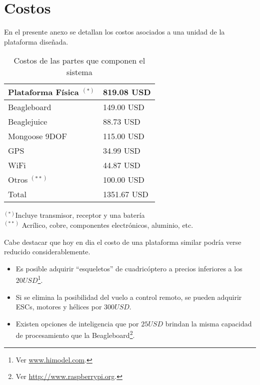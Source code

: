 \documentclass[main]{subfiles}
\begin{document}
\chapter{Costos}
\label{chap:anexo_costos}
En el presente anexo se detallan los costos asociados a una unidad de la plataforma dise\~nada. 

\begin{table}[H]
\begin{center}
\begin{tabular}{|p{5cm}|p{3cm}|}
\hline
Plataforma F\'isica $^{(*)}$  & 819.08 USD  \\
\hline
Beagleboard & 149.00 USD \\
\hline
Beaglejuice & 88.73 USD\\
\hline 
Mongoose 9DOF & 115.00 USD\\
\hline
GPS & 34.99 USD\\
\hline
WiFi & 44.87 USD\\
\hline
Otros $^{(**)}$ & 100.00 USD\\
\hline
Total & 1351.67 USD \\
\hline
\end{tabular}
\label{tab:acc-anexo}
\end{center}
\begin{center}
$^{(*)}$Incluye transmisor, receptor y una bater\'ia\\
$^{(**)}$ Acr\'ilico, cobre, componentes electr\'onicos, aluminio, etc.
\end{center}
\caption{Costos de las partes que componen el sistema}
\end{table}

Cabe destacar que hoy en dia el costo de una plataforma similar podr\'ia verse reducido considerablemente.
\begin{itemize}
\item Es posible adquirir ``esqueletos'' de cuadric\'optero a precios inferiores a los $20USD$\footnote{Ver \url{www.himodel.com}.}.
\item Si se elimina la posibilidad del vuelo a control remoto, se pueden adquirir ESCs, motores y h\'elices por $300 USD$.
\item Existen opciones de inteligencia que por $25USD$ brindan la misma capacidad de procesamiento que la Beagleboard\footnote{Ver \url{http://www.raspberrypi.org}.}.
\end{itemize}
\end{document}

